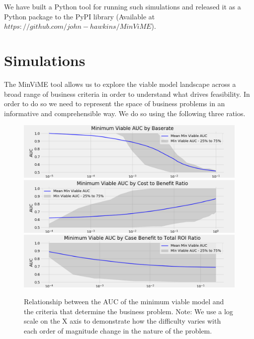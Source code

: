 \documentclass[12pt,a4paper]{article}
\numberwithin{equation}{section}
\begin{document}
We have built a Python tool for running such simulations and released it as a Python package
to the PyPI library (Available at $https://github.com/john-hawkins/MinViME$). 

\section{Simulations}

The MinViME tool allows us to explore the viable model landscape across a broad range of business
criteria in order to understand what drives feasibility. In order to do so we need to represent
the space of business problems in an informative and comprehensible way. We do so using the following
three ratios.

\begin{figure}[!ht]
\includegraphics[scale=0.5]{images/AUC_by_Baserate.png}
\includegraphics[scale=0.5]{images/AUC_by_Cost_to_Benefit.png}
\includegraphics[scale=0.5]{images/AUC_by_Benefit_to_Total.png}
\caption{Relationship between the AUC of the minimum viable model and the criteria that determine
the business problem. Note: We use a log scale on the X axis to demonstrate how
the difficulty varies with each order of magnitude change in the nature of the problem.
}
\label{fig:threeplots}
\end{figure}
\end{document}
